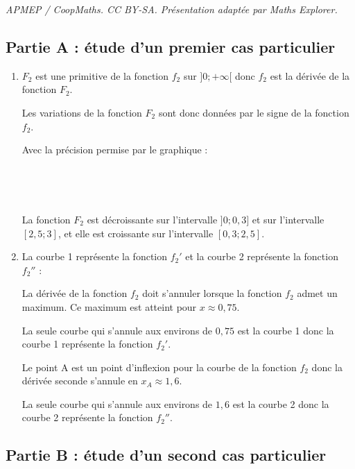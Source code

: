 \documentclass[10pt]{article}
\begin{document}
\noindent\textit{APMEP / CoopMaths. CC BY-SA. Présentation adaptée par Maths Explorer.}\par\medskip
\subsection*{Partie A : étude d'un premier cas particulier}

\begin{enumerate}
	\item 
	 $F_{2}$ est une primitive de la fonction $f_{2}$ sur $] 0 ;+\infty[$ donc $f_2$ est la dérivée de la fonction $F_{2}$. 
	 
	 Les variations de la fonction $F_2$ sont donc données par le signe de la fonction $f_2$. 
	 
	 
	 
	
	Avec la précision permise par le graphique : 
	
	
	
	
		\hfill~
	\hfill~
	
La fonction $F_{2}$ est décroissante sur  l'intervalle $]0;0,3]$ et sur l'intervalle $[2,5;3]$, et elle est  croissante sur l'intervalle $[0,3 ; 2,5]$.
	
	\item   La courbe   1  représente la fonction $f_{2}'$ et la courbe 2  représente la fonction $f_{2}''$ : 
	
	La dérivée de la fonction $f_2$ doit s'annuler lorsque la fonction $f_2$ admet un maximum. Ce maximum est atteint pour $x \approx 0,75$. 
	
	La seule courbe qui s'annule aux environs de $0,75$ est la courbe 1 donc la courbe 1 représente la fonction $f_2'$.
	
	Le point A est un point d'inflexion pour la courbe de la fonction $f_2$ donc la dérivée seconde s'annule en  $x_A \approx 1,6$. 
	
	 La seule courbe qui s'annule aux environs de $1,6$ est la courbe 2 donc la courbe 2 représente la fonction $f_2''$.

\end{enumerate}

\subsection*{Partie B : étude d'un second cas particulier}
\end{document}
